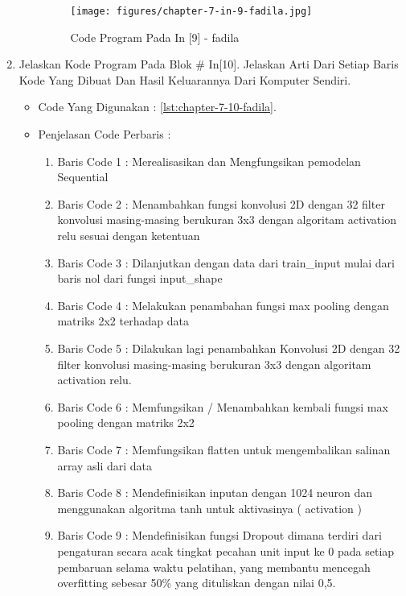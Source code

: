 \begin{enumerate}
\begin{itemize}
\begin{figure}[!hbtp]
\centering
\texttt{[image: figures/chapter-7-in-9-fadila.jpg]}
\caption{Code Program Pada In [9] - fadila}
\label{chapter-7-in-9-fadila}
\end{figure}
\par
\par
\end{itemize}
\par
\par
\par
\item Jelaskan Kode Program Pada Blok \# In[10]. Jelaskan Arti Dari Setiap Baris Kode Yang Dibuat Dan Hasil Keluarannya Dari Komputer Sendiri.
\begin{itemize}
\item Code Yang Digunakan : \ref{lst:chapter-7-10-fadila}.

\par
\par
\item Penjelasan Code Perbaris	: 
\begin{enumerate}
\item Baris Code 1	: Merealisasikan dan Mengfungsikan pemodelan Sequential
\item Baris Code 2	: Menambahkan fungsi konvolusi 2D dengan 32 filter konvolusi masing-masing berukuran 3x3 dengan algoritam activation relu sesuai dengan ketentuan
\item Baris Code 3	: Dilanjutkan dengan data dari train\_input mulai dari baris nol dari fungsi input\_shape
\item Baris Code 4	: Melakukan penambahan fungsi max pooling dengan matriks 2x2 terhadap data
\item Baris Code 5	: Dilakukan lagi penambahkan Konvolusi 2D dengan 32 filter konvolusi masing-masing berukuran 3x3 dengan algoritam activation relu.
\item Baris Code 6	: Memfungsikan / Menambahkan kembali fungsi max pooling dengan matriks 2x2
\item Baris Code 7	: Memfungsikan flatten untuk mengembalikan salinan array asli dari data
\item Baris Code 8	: Mendefinisikan inputan dengan 1024 neuron dan menggunakan algoritma tanh untuk aktivasinya ( activation )
\item Baris Code 9	: Mendefinisikan fungsi Dropout dimana terdiri dari pengaturan secara acak tingkat pecahan unit input ke 0 pada setiap pembaruan selama waktu pelatihan, yang membantu mencegah overfitting sebesar 50\%  yang dituliskan dengan nilai 0,5.

\end{enumerate}
\end{itemize}
\end{enumerate}

